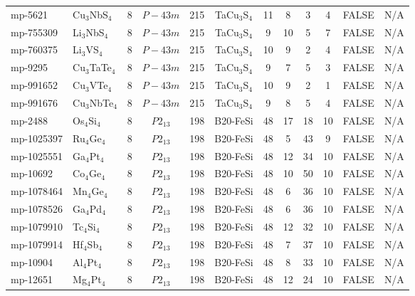 {\begin{longtable}{llcccccccccc}
    mp-5621 & Cu$_{3}$NbS$_{4}$ & 8     & $P-43m$ & 215   & TaCu$_{3}$S$_{4}$ & 11    & 8     & 3     & 4     & FALSE & N/A \\
    mp-755309 & Li$_{3}$NbS$_{4}$ & 8     & $P-43m$ & 215   & TaCu$_{3}$S$_{4}$ & 9     & 10    & 5     & 7     & FALSE & N/A \\
    mp-760375 & Li$_{3}$VS$_{4}$ & 8     & $P-43m$ & 215   & TaCu$_{3}$S$_{4}$ & 10    & 9     & 2     & 4     & FALSE & N/A \\
    mp-9295 & Cu$_{3}$TaTe$_{4}$ & 8     & $P-43m$ & 215   & TaCu$_{3}$S$_{4}$ & 9     & 7     & 5     & 3     & FALSE & N/A \\
    mp-991652 & Cu$_{3}$VTe$_{4}$ & 8     & $P-43m$ & 215   & TaCu$_{3}$S$_{4}$ & 10    & 9     & 2     & 1     & FALSE & N/A \\
    mp-991676 & Cu$_{3}$NbTe$_{4}$ & 8     & $P-43m$ & 215   & TaCu$_{3}$S$_{4}$ & 9     & 8     & 5     & 4     & FALSE & N/A \\
    mp-2488 & Os$_{4}$Si$_{4}$ & 8     & $P2_13$ & 198   & B20-FeSi & 48    & 17    & 18    & 10    & FALSE & N/A \\
    mp-1025397 & Ru$_{4}$Ge$_{4}$ & 8     & $P2_13$ & 198   & B20-FeSi & 48    & 5     & 43    & 9     & FALSE & N/A \\
    mp-1025551 & Ga$_{4}$Pt$_{4}$ & 8     & $P2_13$ & 198   & B20-FeSi & 48    & 12    & 34    & 10    & FALSE & N/A \\
    mp-10692 & Co$_{4}$Ge$_{4}$ & 8     & $P2_13$ & 198   & B20-FeSi & 48    & 10    & 50    & 10    & FALSE & N/A \\
    mp-1078464 & Mn$_{4}$Ge$_{4}$ & 8     & $P2_13$ & 198   & B20-FeSi & 48    & 6     & 36    & 10    & FALSE & N/A \\
    mp-1078526 & Ga$_{4}$Pd$_{4}$ & 8     & $P2_13$ & 198   & B20-FeSi & 48    & 6     & 36    & 10    & FALSE & N/A \\
    mp-1079910 & Tc$_{4}$Si$_{4}$ & 8     & $P2_13$ & 198   & B20-FeSi & 48    & 12    & 32    & 10    & FALSE & N/A \\
    mp-1079914 & Hf$_{4}$Sb$_{4}$ & 8     & $P2_13$ & 198   & B20-FeSi & 48    & 7     & 37    & 10    & FALSE & N/A \\
    mp-10904 & Al$_{4}$Pt$_{4}$ & 8     & $P2_13$ & 198   & B20-FeSi & 48    & 8     & 33    & 10    & FALSE & N/A \\
    mp-12651 & Mg$_{4}$Pt$_{4}$ & 8     & $P2_13$ & 198   & B20-FeSi & 48    & 12    & 24    & 10    & FALSE & N/A \\

\end{longtable}}
